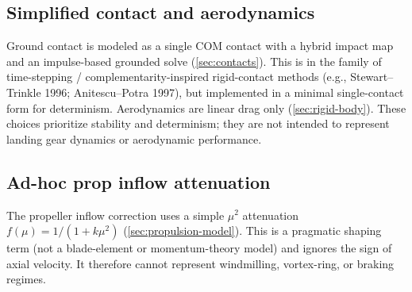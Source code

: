 \subsection{Simplified contact and aerodynamics}
Ground contact is modeled as a single COM contact with a hybrid impact map and an impulse-based grounded solve (\cref{sec:contacts}). This is in the family of time-stepping / complementarity-inspired rigid-contact methods (e.g., Stewart--Trinkle 1996; Anitescu--Potra 1997), but implemented in a minimal single-contact form for determinism. Aerodynamics are linear drag only (\cref{sec:rigid-body}). These choices prioritize stability and determinism; they are not intended to represent landing gear dynamics or aerodynamic performance.

\subsection{Ad-hoc prop inflow attenuation}
The propeller inflow correction uses a simple \(\mu^2\) attenuation \(f(\mu)=1/(1+k\mu^2)\) (\cref{sec:propulsion-model}). This is a pragmatic shaping term (not a blade-element or momentum-theory model) and ignores the sign of axial velocity. It therefore cannot represent windmilling, vortex-ring, or braking regimes.
